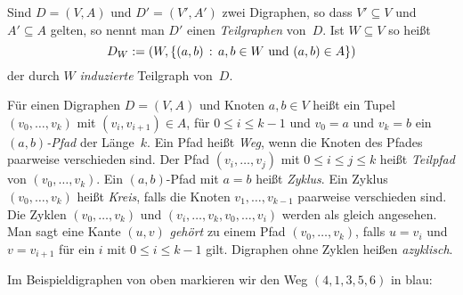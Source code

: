 \begin{defn}
Sind $D=(V,A)$ und $D'=(V',A')$ zwei Digraphen, so dass $V' \subseteq V$ und $A' \subseteq A$ gelten, so nennt man $D'$ einen \emph{Teilgraphen} von~$D$.
Ist $W \subseteq V$ so heißt
\[
D_{W} := \left( W, \left\{ (a,b) \,:\, a,b \in W \text{ und } (a,b) \in A \right\} \right)
\]
der durch $W$ \emph{induzierte} Teilgraph von~$D$.
\end{defn}

\begin{defn} 
Für einen Digraphen $D=(V,A)$ und Knoten $a,b \in V$ heißt ein Tupel $(v_0,\ldots,v_k)$ mit $(v_i,v_{i+1}) \in A$, für $0 \leq i \leq k-1$ und $v_0=a$ und $v_k=b$ ein \emph{$(a,b)$-Pfad} der Länge~$k$.
Ein Pfad heißt \emph{Weg}, wenn die Knoten des Pfades paarweise verschieden sind.
Der Pfad $(v_i,\ldots,v_j)$ mit $0 \le i \le j \le k$ heißt \emph{Teilpfad} von $(v_0,\ldots,v_k)$.
Ein $(a,b)$-Pfad mit $a=b$ heißt \emph{Zyklus}.
Ein Zyklus $(v_0,\ldots,v_k)$ heißt \emph{Kreis}, falls die Knoten $v_1,\ldots,v_{k-1}$ paarweise verschieden sind.
Die Zyklen $(v_0,\ldots,v_k)$ und $(v_i,\ldots,v_k,v_0,\ldots,v_i)$ werden als gleich angesehen.
Man sagt eine Kante $(u,v)$ \emph{gehört} zu einem Pfad $(v_0,\ldots,v_k)$, falls $u=v_i$ und $v=v_{i+1}$ für ein $i$ mit $0 \le i \leq k-1$ gilt.
Digraphen ohne Zyklen heißen \emph{azyklisch}.
\end{defn} 


\begin{bsp} 
Im Beispieldigraphen von oben markieren wir den Weg $(4,1,3,5,6)$ in blau:

\begin{center}
\end{center}
\end{bsp} 

